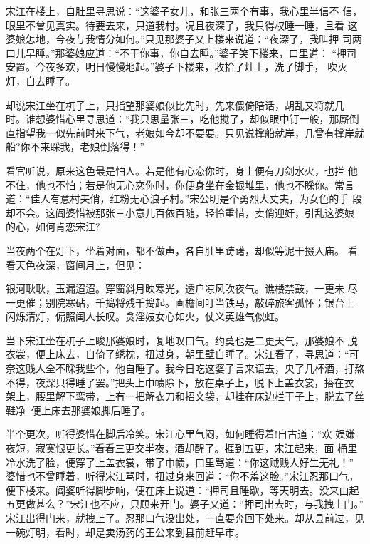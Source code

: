 宋江在楼上，自肚里寻思说：“这婆子女儿，和张三两个有事，我心里半信不
信，眼里不曾见真实。待要去来，只道我村。况且夜深了，我只得权睡一睡，且看
这婆娘怎地，今夜与我情分如何。”只见那婆子又上楼来说道：“夜深了，我叫押
司两口儿早睡。”那婆娘应道：“不干你事，你自去睡。”婆子笑下楼来，口里道：
“押司安置。今夜多欢，明日慢慢地起。”婆子下楼来，收拾了灶上，洗了脚手，
吹灭灯，自去睡了。

却说宋江坐在杌子上，只指望那婆娘似比先时，先来偎倚陪话，胡乱又将就几
时。谁想婆惜心里寻思道：“我只思量张三，吃他搅了，却似眼中钉一般，那厮倒
直指望我一似先前时来下气，老娘如今却不要耍。只见说撑船就岸，几曾有撑岸就
船?你不来睬我，老娘倒落得！”

看官听说，原来这色最是怕人。若是他有心恋你时，身上便有刀剑水火，也拦
他不住，他也不怕；若是他无心恋你时，你便身坐在金银堆里，他也不睬你。常言
道：“佳人有意村夫俏，红粉无心浪子村。”宋公明是个勇烈大丈夫，为女色的手
段却不会。这阎婆惜被那张三小意儿百依百随，轻怜重惜，卖俏迎奸，引乱这婆娘
的心，如何肯恋宋江?

当夜两个在灯下，坐着对面，都不做声，各自肚里踌躇，却似等泥干掇入庙。
看看天色夜深，窗间月上，但见：

银河耿耿，玉漏迢迢。穿窗斜月映寒光，透户凉风吹夜气。谯楼禁鼓，一更未
尽一更催；别院寒砧，千捣将残千捣起。画檐间叮当铁马，敲碎旅客孤怀；银台上
闪烁清灯，偏照闺人长叹。贪淫妓女心如火，仗义英雄气似虹。

当下宋江坐在杌子上睃那婆娘时，复地叹口气。约莫也是二更天气，那婆娘不
脱衣裳，便上床去，自倚了绣枕，扭过身，朝里壁自睡了。宋江看了，寻思道：“可
奈这贱人全不睬我些个，他自睡了。我今日吃这婆子言来语去，央了几杯酒，打熬
不得，夜深只得睡了罢。”把头上巾帻除下，放在桌子上，脱下上盖衣裳，搭在衣
架上，腰里解下鸾带，上有一把解衣刀和招文袋，却挂在床边栏干子上，脱去了丝
鞋净，便上床去那婆娘脚后睡了。

半个更次，听得婆惜在脚后冷笑。宋江心里气闷，如何睡得着!自古道：“欢
娱嫌夜短，寂寞恨更长。”看看三更交半夜，酒却醒了。捱到五更，宋江起来，面
桶里冷水洗了脸，便穿了上盖衣裳，带了巾帻，口里骂道：“你这贼贱人好生无礼！”
婆惜也不曾睡着，听得宋江骂时，扭过身来回道：“你不羞这脸。”宋江忍那口气，
便下楼来。阎婆听得脚步响，便在床上说道：“押司且睡歇，等天明去。没来由起
五更做甚么？”宋江也不应，只顾来开门。婆子又道：“押司出去时，与我拽上门。”
宋江出得门来，就拽上了。忍那口气没出处，一直要奔回下处来。却从县前过，见
一碗灯明，看时，却是卖汤药的王公来到县前赶早市。

